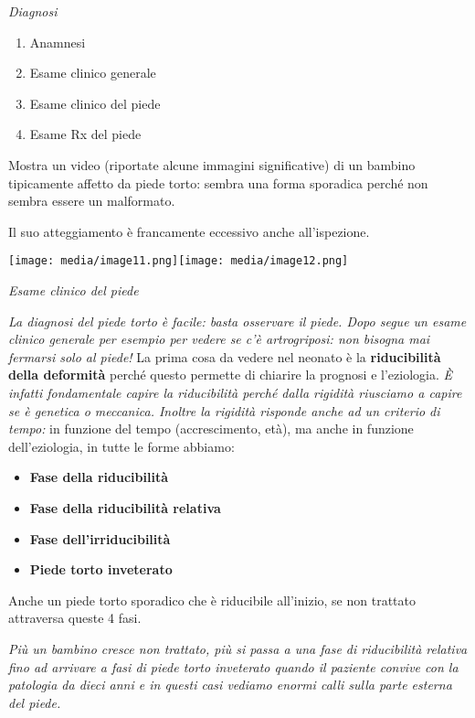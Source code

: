 \documentclass[]{article}
\begin{document}
\emph{Diagnosi}

\begin{enumerate}
\def\labelenumi{\arabic{enumi}.}
\item
  Anamnesi
\item
  Esame clinico generale
\item
  Esame clinico del piede
\item
  Esame Rx del piede
\end{enumerate}

Mostra un video (riportate alcune immagini significative) di un bambino
tipicamente affetto da piede torto: sembra una forma sporadica perché
non sembra essere un malformato.

Il suo atteggiamento è francamente eccessivo anche all'ispezione.

\texttt{[image: media/image11.png]}\texttt{[image: media/image12.png]}

\emph{Esame clinico del piede}

\emph{La diagnosi del piede torto è facile: basta osservare il piede.
Dopo segue un esame clinico generale per esempio per vedere se c'è
artrogriposi: non bisogna mai fermarsi solo al piede!} La prima cosa da
vedere nel neonato è la \textbf{riducibilità della deformità} perché
questo permette di chiarire la prognosi e l'eziologia. \emph{È infatti
fondamentale capire la riducibilità perché dalla rigidità riusciamo a
capire se è genetica o meccanica. Inoltre la rigidità risponde anche ad
un criterio di tempo:} in funzione del tempo (accrescimento, età), ma
anche in funzione dell'eziologia, in tutte le forme abbiamo:

\begin{itemize}
\item
  \textbf{Fase della riducibilità}
\item
  \textbf{Fase della riducibilità relativa}
\item
  \textbf{Fase dell'irriducibilità}
\item
  \textbf{Piede torto inveterato}
\end{itemize}

Anche un piede torto sporadico che è riducibile all'inizio, se non
trattato attraversa queste 4 fasi.

\emph{Più un bambino cresce non trattato, più si passa a una fase di
riducibilità relativa fino ad arrivare a fasi di piede torto inveterato
quando il paziente convive con la patologia da dieci anni e in questi
casi vediamo enormi calli sulla parte esterna del piede.}
\end{document}
